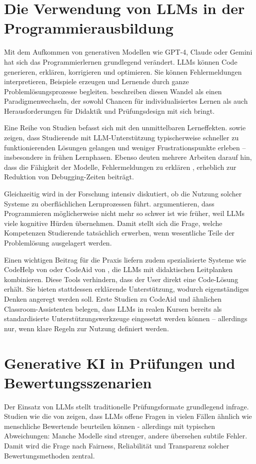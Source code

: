 \section{Die Verwendung von LLMs in der Programmierausbildung}
Mit dem Aufkommen von generativen Modellen wie GPT-4, Claude oder Gemini hat sich das Programmierlernen grundlegend verändert. LLMs können Code generieren, erklären, korrigieren und optimieren. Sie können Fehlermeldungen interpretieren, Beispiele erzeugen und Lernende durch ganze Problemlösungsprozesse begleiten. \textcite[S.~1]{DennyEra} beschreiben diesen Wandel als einen Paradigmenwechseln, der sowohl Chancen für individualisiertes Lernen als auch Herausforderungen für Didaktik und Prüfungsdesign mit sich bringt.

Eine Reihe von Studien befasst sich mit den unmittelbaren Lerneffekten. \textcite[S.~1]{RobotsAreComming} sowie \textcite[S.~1]{KazemitabaarCodeAid} zeigen, dass Studierende mit LLM-Unterstützung typischerweise schneller zu funktionierenden Lösungen gelangen und weniger Frustrationspunkte erleben – insbesondere in frühen Lernphasen. Ebenso deuten mehrere Arbeiten darauf hin, dass die Fähigkeit der Modelle, Fehlermeldungen zu erklären \textcite[S.~1]{LeinonenErrorMessages}, erheblich zur Reduktion von Debugging-Zeiten beiträgt.

Gleichzeitig wird in der Forschung intensiv diskutiert, ob die Nutzung solcher Systeme zu oberflächlichen Lernprozessen führt. \textcite[S.~1]{BeckerProgrammingHard} argumentieren, dass Programmieren möglicherweise nicht mehr so schwer ist wie früher, weil LLMs viele kognitive Hürden übernehmen. Damit stellt sich die Frage, welche Kompetenzen Studierende tatsächlich erwerben, wenn wesentliche Teile der Problemlösung ausgelagert werden.

Einen wichtigen Beitrag für die Praxis liefern zudem spezialisierte Systeme wie CodeHelp von \textcite[S.~1]{CodeHelp} oder CodeAid von \textcite[S.~3]{KazemitabaarCodeAid}, die LLMs mit didaktischen Leitplanken kombinieren. Diese Tools verhindern, dass der User direkt eine Code-Lösung erhält. Sie bieten stattdessen erklärende Unterstützung, wodurch eigenständiges Denken angeregt werden soll. Erste Studien zu CodeAid und ähnlichen Classroom-Assistenten belegen, dass LLMs in realen Kursen bereits als standardisierte Unterstützungswerkzeuge eingesetzt werden können – allerdings nur, wenn klare Regeln zur Nutzung definiert werden.



\section{Generative KI in Prüfungen und Bewertungsszenarien}
Der Einsatz von LLMs stellt traditionelle Prüfungsformate grundlegend infrage. Studien wie die von \textcite[S.~6]{PintoLLMsForEducation} zeigen, dass LLMs offene Fragen in vielen Fällen ähnlich wie menschliche Bewertende beurteilen können - allerdings mit typischen Abweichungen: Manche Modelle sind strenger, andere übersehen subtile Fehler. Damit wird die Frage nach Fairness, Reliabilität und Transparenz solcher Bewertungsmethoden zentral.

